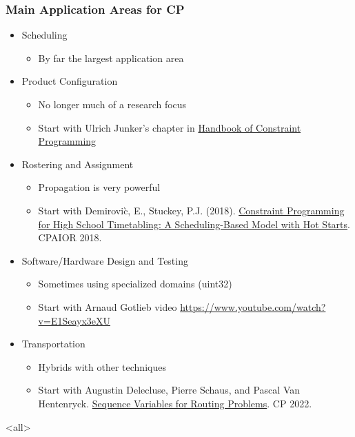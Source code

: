 \begin{frame}
\frametitle{Main Application Areas for CP}
\begin{itemize}
\item Scheduling
\begin{itemize}
\item By far the largest application area
\end{itemize}
\item Product Configuration
\begin{itemize}
\item No longer much of a research focus
\item Start with Ulrich Junker's chapter in \href{https://www.sciencedirect.com/bookseries/foundations-of-artificial-intelligence/vol/2/suppl/C}{Handbook of Constraint Programming}
\end{itemize}
\item Rostering and Assignment
\begin{itemize}
\item Propagation is very powerful
\item Start with Demirovi\`{c}, E., Stuckey, P.J. (2018). \href{https://link.springer.com/chapter/10.1007/978-3-319-93031-2_10}{Constraint Programming for High School Timetabling: A Scheduling-Based Model with Hot Starts}. CPAIOR 2018.
\end{itemize}
\item Software/Hardware Design and Testing
\begin{itemize}
\item Sometimes using specialized domains (uint32)
\item Start with Arnaud Gotlieb video \url{https://www.youtube.com/watch?v=E1Seayx3eXU}
\end{itemize}
\item Transportation
\begin{itemize}
\item Hybrids with other techniques
\item Start with Augustin Delecluse, Pierre Schaus, and Pascal Van Hentenryck. \href{https://drops.dagstuhl.de/entities/document/10.4230/LIPIcs.CP.2022.19}{Sequence Variables for Routing Problems}. CP 2022.
\end{itemize}
\end{itemize}
\end{frame}

\mode<all>{

}


